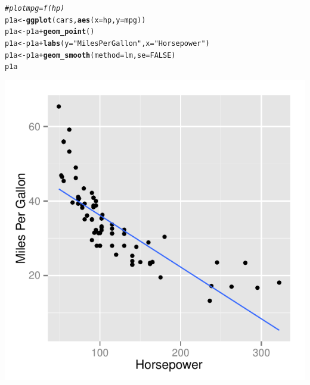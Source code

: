 \documentclass{article}\usepackage[]{graphicx}\usepackage[]{color}
\makeatletter
\def\maxwidth{ %
  \ifdim\Gin@nat@width>\linewidth
    \linewidth
  \else
    \Gin@nat@width
  \fi
}
\newcommand{\hlnum}[1]{\textcolor[rgb]{0.686,0.059,0.569}{#1}}%
\newcommand{\hlstr}[1]{\textcolor[rgb]{0.192,0.494,0.8}{#1}}%
\newcommand{\hlcom}[1]{\textcolor[rgb]{0.678,0.584,0.686}{\textit{#1}}}%
\newcommand{\hlopt}[1]{\textcolor[rgb]{0,0,0}{#1}}%
\newcommand{\hlstd}[1]{\textcolor[rgb]{0.345,0.345,0.345}{#1}}%
\newcommand{\hlkwb}[1]{\textcolor[rgb]{0.69,0.353,0.396}{#1}}%
\newcommand{\hlkwc}[1]{\textcolor[rgb]{0.333,0.667,0.333}{#1}}%
\newcommand{\hlkwd}[1]{\textcolor[rgb]{0.737,0.353,0.396}{\textbf{#1}}}%
\newenvironment{kframe}{%
 \def\at@end@of@kframe{}%
 \ifinner\ifhmode%
  \def\at@end@of@kframe{\end{minipage}}%
  \begin{minipage}{\columnwidth}%
 \fi\fi%
 \def\FrameCommand##1{\hskip\@totalleftmargin \hskip-\fboxsep
 \colorbox{shadecolor}{##1}\hskip-\fboxsep
     \hskip-\linewidth \hskip-\@totalleftmargin \hskip\columnwidth}%
 \MakeFramed {\advance\hsize-\width
   \@totalleftmargin\z@ \linewidth\hsize
   \@setminipage}}%
 {\par\unskip\endMakeFramed%
 \at@end@of@kframe}
\newenvironment{knitrout}{}{} %
\makeatother
\begin{document}
\begin{knitrout}
\color{fgcolor}\begin{kframe}
\begin{alltt}
\hlcom{# plot mpg = f(hp)}
\hlstd{p1a} \hlkwb{<-} \hlkwd{ggplot}\hlstd{(cars,} \hlkwd{aes}\hlstd{(}\hlkwc{x} \hlstd{= hp,} \hlkwc{y} \hlstd{= mpg))}
\hlstd{p1a} \hlkwb{<-} \hlstd{p1a} \hlopt{+} \hlkwd{geom_point}\hlstd{()}
\hlstd{p1a} \hlkwb{<-} \hlstd{p1a} \hlopt{+} \hlkwd{labs}\hlstd{(}\hlkwc{y} \hlstd{=} \hlstr{"Miles Per Gallon"}\hlstd{,} \hlkwc{x} \hlstd{=} \hlstr{"Horsepower"}\hlstd{)}
\hlstd{p1a} \hlkwb{<-} \hlstd{p1a} \hlopt{+} \hlkwd{geom_smooth}\hlstd{(}\hlkwc{method} \hlstd{= lm,} \hlkwc{se} \hlstd{=} \hlnum{FALSE}\hlstd{)}
\hlstd{p1a}
\end{alltt}
\end{kframe}

{\centering \includegraphics[width=\maxwidth]{figure/1a-1} 

}



\end{knitrout}
\end{document}

